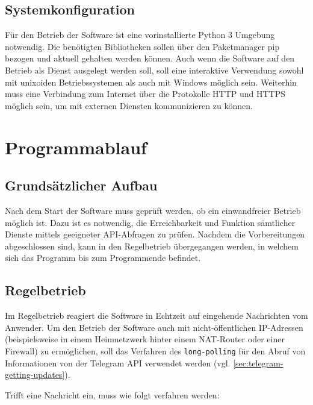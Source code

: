 \subsection{Systemkonfiguration}
Für den Betrieb der Software ist eine vorinstallierte Python 3 Umgebung notwendig. Die benötigten Bibliotheken sollen über den Paketmanager pip bezogen und aktuell gehalten werden können. Auch wenn die Software auf den Betrieb als Dienst ausgelegt werden soll, soll eine interaktive Verwendung sowohl mit unixoiden Betriebssystemen als auch mit Windows möglich sein. Weiterhin muss eine Verbindung zum Internet über die Protokolle HTTP und HTTPS möglich sein, um mit externen Diensten kommunizieren zu können.

\section{Programmablauf}

\subsection{Grundsätzlicher Aufbau}

Nach dem Start der Software muss geprüft werden, ob ein einwandfreier Betrieb möglich ist. Dazu ist es notwendig, die Erreichbarkeit und Funktion sämtlicher Dienste mittels geeigneter API-Abfragen zu prüfen. Nachdem die Vorbereitungen abgeschlossen sind, kann in den Regelbetrieb übergegangen werden, in welchem sich das Programm bis zum Programmende befindet. 

\subsection{Regelbetrieb}

Im Regelbetrieb reagiert die Software in Echtzeit auf eingehende Nachrichten vom Anwender. 
Um den Betrieb der Software auch mit nicht-öffentlichen IP-Adressen (beispielsweise in einem Heimnetzwerk hinter einem NAT-Router oder einer Firewall) zu ermöglichen, soll das Verfahren des \lstinline{long-polling} für den Abruf von Informationen von der Telegram API verwendet werden (vgl. \autoref{sec:telegram-getting-updates}).

Trifft eine Nachricht ein, muss wie folgt verfahren werden: 

